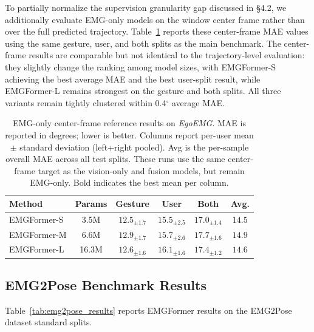 \documentclass{article}
\newcommand{\dataset}{\textit{EgoEMG}}
\newcommand{\model}{EMGFormer}
\begin{document}
To partially normalize the supervision granularity gap discussed in \S4.2, we additionally evaluate EMG-only models on the window center frame rather than over the full predicted trajectory. Table~\ref{tab:center_frame_emg} reports these center-frame MAE values using the same gesture, user, and both splits as the main benchmark. The center-frame results are comparable but not identical to the trajectory-level evaluation: they slightly change the ranking among model sizes, with \model{}-S achieving the best average MAE and the best user-split result, while \model{}-L remains strongest on the gesture and both splits. All three variants remain tightly clustered within 0.4$^\circ$ average MAE.

\begin{table}[h]
\centering
\caption{EMG-only center-frame reference results on \dataset{}. MAE is reported in degrees; lower is better. Columns report per-user mean $\pm$ standard deviation (left+right pooled). Avg is the per-sample overall MAE across all test splits. These runs use the same center-frame target as the vision-only and fusion models, but remain EMG-only. Bold indicates the best mean per column.}
\label{tab:center_frame_emg}
\footnotesize
\setlength{\tabcolsep}{3.5pt}
\renewcommand{\arraystretch}{1.05}
\begin{tabular}{lccccc}
\toprule
Method & Params & Gesture & User & Both & Avg. \\
\midrule
\model{}-S & 3.5M & $12.5_{\pm1.7}$ & $\mathbf{15.5_{\pm2.5}}$ & $17.0_{\pm1.4}$ & $\mathbf{14.5}$ \\
\model{}-M & 6.6M & $12.9_{\pm1.7}$ & $15.7_{\pm2.6}$ & $17.7_{\pm1.6}$ & $14.9$ \\
\model{}-L & 16.3M & $\mathbf{12.6_{\pm1.6}}$ & $16.1_{\pm1.6}$ & $\mathbf{17.4_{\pm1.2}}$ & $14.6$ \\
\bottomrule
\end{tabular}
\end{table}

\subsection{EMG2Pose Benchmark Results}
\label{app:emg2pose_results}

Table~\ref{tab:emg2pose_results} reports \model{} results on the EMG2Pose dataset standard splits.
\end{document}
